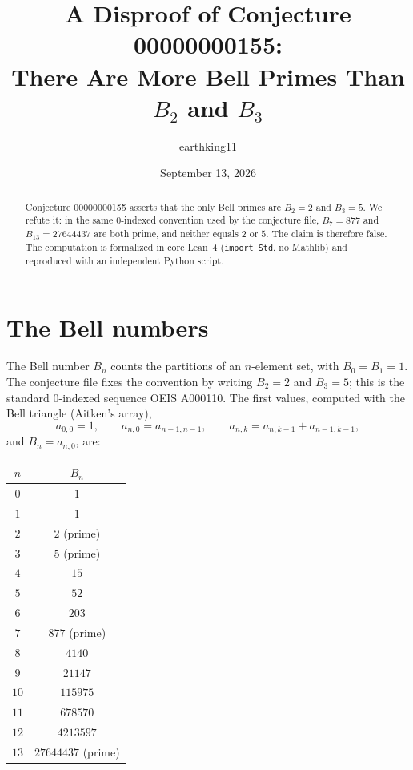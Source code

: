 \documentclass[11pt]{article}
\title{A Disproof of Conjecture 00000000155:\\
There Are More Bell Primes Than $B_2$ and $B_3$}
\author{earthking11}
\date{September 13, 2026}
\theoremstyle{definition}
\begin{document}
\maketitle

\begin{abstract}
Conjecture 00000000155 asserts that the only Bell primes are $B_2 = 2$ and
$B_3 = 5$. We refute it: in the same $0$-indexed convention used by the
conjecture file, $B_7 = 877$ and $B_{13} = 27644437$ are both prime, and
neither equals $2$ or $5$. The claim is therefore false. The computation is
formalized in core Lean~4 (\texttt{import Std}, no Mathlib) and reproduced
with an independent Python script.
\end{abstract}

\section{The Bell numbers}

The Bell number $B_n$ counts the partitions of an $n$-element set, with
$B_0 = B_1 = 1$. The conjecture file fixes the convention by writing
$B_2 = 2$ and $B_3 = 5$; this is the standard $0$-indexed sequence
OEIS A000110. The first values, computed with the Bell triangle
(Aitken's array),
\[
a_{0,0} = 1,\qquad
a_{n,0} = a_{n-1,n-1},\qquad
a_{n,k} = a_{n,k-1} + a_{n-1,k-1},
\]
and $B_n = a_{n,0}$, are:

\begin{center}
\begin{tabular}{cc}
\toprule
$n$ & $B_n$ \\
\midrule
$0$  & $1$ \\
$1$  & $1$ \\
$2$  & $2$ \quad (prime) \\
$3$  & $5$ \quad (prime) \\
$4$  & $15$ \\
$5$  & $52$ \\
$6$  & $203$ \\
$7$  & $877$ \quad (prime) \\
$8$  & $4140$ \\
$9$  & $21147$ \\
$10$ & $115975$ \\
$11$ & $678570$ \\
$12$ & $4213597$ \\
$13$ & $27644437$ \quad (prime) \\
\bottomrule
\end{tabular}
\end{center}
\end{document}
